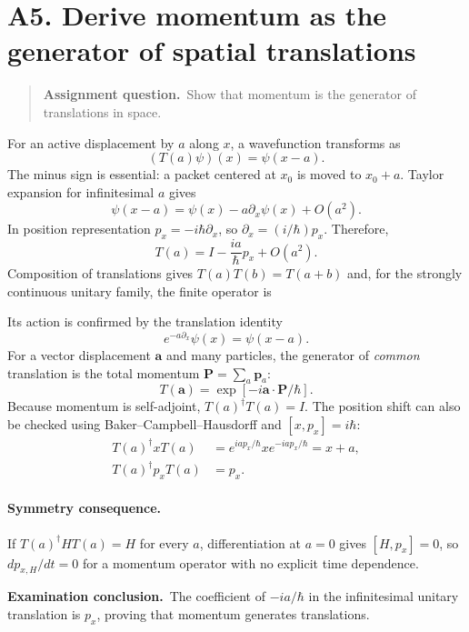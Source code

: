 \documentclass[11pt,a4paper]{article}
\theoremstyle{definition}
\newcommand{\result}[1]{\begin{center}\fcolorbox{light}{white}{\begin{minipage}{0.88\textwidth}\centering\vspace{2pt}\(\displaystyle #1\)\vspace{2pt}\end{minipage}}\end{center}}
\newenvironment{question}{\begin{quote}\small\noindent\textbf{Assignment question.}\ }{\end{quote}}
\newcommand{\exam}[1]{\par\medskip\noindent\textbf{Examination conclusion.}\ #1\par}
\begin{document}
\section{A5. Derive momentum as the generator of spatial translations}
\begin{question}Show that momentum is the generator of translations in space.\end{question}
For an active displacement by $a$ along $x$, a wavefunction transforms as
\begin{equation}
(T(a)\psi)(x)=\psi(x-a).
\label{eq:A-Tpsi}
\end{equation}
The minus sign is essential: a packet centered at $x_0$ is moved to $x_0+a$. Taylor expansion for infinitesimal $a$ gives
\begin{equation}
\psi(x-a)=\psi(x)-a\partial_x\psi(x)+O(a^2).
\end{equation}
In position representation $p_x=-i\hbar\partial_x$, so $\partial_x=(i/\hbar)p_x$. Therefore,
\begin{equation}
T(a)=I-\frac{ia}{\hbar}p_x+O(a^2).
\end{equation}
Composition of translations gives $T(a)T(b)=T(a+b)$ and, for the strongly continuous unitary family, the finite operator is
\result{T(a)=\exp\!\left(-\frac{ia}{\hbar}p_x\right).}
Its action is confirmed by the translation identity
\begin{equation}
e^{-a\partial_x}\psi(x)=\psi(x-a).
\end{equation}
For a vector displacement $\mathbf a$ and many particles, the generator of \emph{common} translation is the total momentum $\mathbf P=\sum_a\mathbf p_a$:
\begin{equation}
T(\mathbf a)=\exp[-i\mathbf a\cdot\mathbf P/\hbar].
\end{equation}
Because momentum is self-adjoint, $T(a)^\dagger T(a)=I$. The position shift can also be checked using Baker--Campbell--Hausdorff and $[x,p_x]=i\hbar$:
\begin{align}
T(a)^\dagger xT(a)&=e^{ia p_x/\hbar}xe^{-ia p_x/\hbar}=x+a,\\
T(a)^\dagger p_xT(a)&=p_x.
\end{align}
\paragraph{Symmetry consequence.} If $T(a)^\dagger HT(a)=H$ for every $a$, differentiation at $a=0$ gives $[H,p_x]=0$, so $d p_{x,H}/dt=0$ for a momentum operator with no explicit time dependence.
\exam{The coefficient of $-ia/\hbar$ in the infinitesimal unitary translation is $p_x$, proving that momentum generates translations.}
\end{document}
